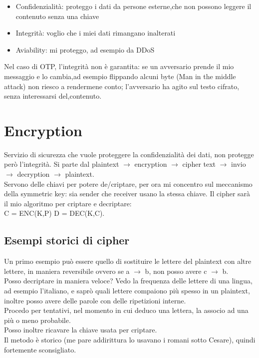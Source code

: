 \documentclass[16px]{article}
\begin{document}
\begin{itemize}
\item Confidenzialità: proteggo i dati da persone esterne,che non possono leggere il contenuto senza una chiave
\item Integrità: voglio che i miei dati rimangano inalterati
\item Aviability: mi proteggo, ad esempio da DDoS
\end{itemize}
Nel caso di OTP, l'integrità non è garantita: se un avversario prende il mio messaggio e lo cambia,ad esempio flippando alcuni byte (Man in the middle attack) non riesco a rendermene conto; l'avversario ha agito sul testo cifrato, senza interessarsi del,contenuto.
\section{Encryption}
Servizio di sicurezza che vuole proteggere la confidenzialità dei dati, non protegge però l'integrità. Si parte dal plaintext $\longrightarrow$ encryption $\longrightarrow$ cipher text $\longrightarrow$ invio $\longrightarrow$ decryption $\longrightarrow$ plaintext.\\ Servono delle chiavi per potere de/criptare, per ora mi concentro sul meccanismo della symmetric key: sia sender che receiver usano la stessa chiave. Il cipher sarà il mio algoritmo per criptare e decriptare:\\
C = ENC(K,P) D = DEC(K,C).
\subsection{Esempi storici di cipher}
Un primo esempio può essere quello di sostituire le lettere del plaintext con altre lettere, in maniera reversibile ovvero se a $\longrightarrow$ b, non posso avere c $\longrightarrow$ b.\\ Posso decriptare in maniera veloce? Vedo la frequenza delle lettere di una lingua, ad esempio l'italiano, e saprò quali lettere compaiono più spesso in un plaintext, inoltre posso avere delle parole con delle ripetizioni interne.\\ Procedo per tentativi, nel momento in cui deduco una lettera, la associo ad una più o meno probabile.\\ Posso inoltre ricavare la chiave usata per criptare.\\ Il metodo è storico (me pare addirittura lo usavano i romani sotto Cesare),  quindi fortemente sconsigliato.
\end{document}
